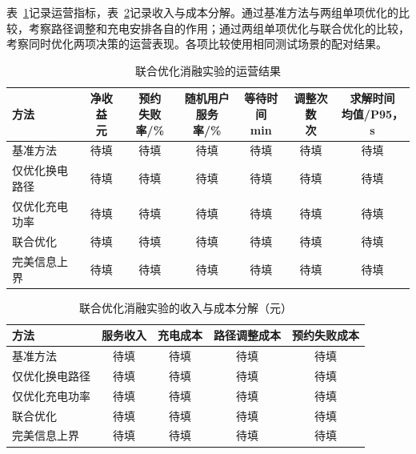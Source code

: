 表~\ref{exp:joint_results}记录运营指标，表~\ref{exp:joint_costs}记录收入与成本分解。通过基准方法与两组单项优化的比较，考察路径调整和充电安排各自的作用；通过两组单项优化与联合优化的比较，考察同时优化两项决策的运营表现。各项比较使用相同测试场景的配对结果。

\begin{table}[!htbp]
  \centering
  \caption{联合优化消融实验的运营结果}
  \label{exp:joint_results}
  \small
  \setlength{\tabcolsep}{3pt}
  \begin{tabularx}{\linewidth}{@{}Xcccccc@{}}
    \toprule
    方法 & \shortstack{净收益\\元} & \shortstack{预约\\失败率/\%} & \shortstack{随机用户\\服务率/\%} & \shortstack{等待时间\\min} & \shortstack{调整次数\\次} & \shortstack{求解时间\\均值/P95，s} \\
    \midrule
    基准方法 & 待填 & 待填 & 待填 & 待填 & 待填 & 待填 \\
    仅优化换电路径 & 待填 & 待填 & 待填 & 待填 & 待填 & 待填 \\
    仅优化充电功率 & 待填 & 待填 & 待填 & 待填 & 待填 & 待填 \\
    联合优化 & 待填 & 待填 & 待填 & 待填 & 待填 & 待填 \\
    完美信息上界 & 待填 & 待填 & 待填 & 待填 & 待填 & 待填 \\
    \bottomrule
  \end{tabularx}
\end{table}

\begin{table}[!htbp]
  \centering
  \caption{联合优化消融实验的收入与成本分解（元）}
  \label{exp:joint_costs}
  \small
  \begin{tabularx}{\linewidth}{@{}Xcccc@{}}
    \toprule
    方法 & 服务收入 & 充电成本 & 路径调整成本 & 预约失败成本 \\
    \midrule
    基准方法 & 待填 & 待填 & 待填 & 待填 \\
    仅优化换电路径 & 待填 & 待填 & 待填 & 待填 \\
    仅优化充电功率 & 待填 & 待填 & 待填 & 待填 \\
    联合优化 & 待填 & 待填 & 待填 & 待填 \\
    完美信息上界 & 待填 & 待填 & 待填 & 待填 \\
    \bottomrule
  \end{tabularx}
\end{table}

